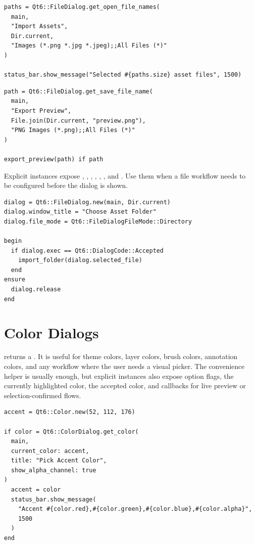 \begin{lstlisting}[style=crystal]
paths = Qt6::FileDialog.get_open_file_names(
  main,
  "Import Assets",
  Dir.current,
  "Images (*.png *.jpg *.jpeg);;All Files (*)"
)

status_bar.show_message("Selected #{paths.size} asset files", 1500)
\end{lstlisting}

\begin{lstlisting}[style=crystal]
path = Qt6::FileDialog.get_save_file_name(
  main,
  "Export Preview",
  File.join(Dir.current, "preview.png"),
  "PNG Images (*.png);;All Files (*)"
)

export_preview(path) if path
\end{lstlisting}

Explicit instances expose , , , , , , and . Use them when a file workflow needs to be configured before the dialog is shown.

\begin{lstlisting}[style=crystal]
dialog = Qt6::FileDialog.new(main, Dir.current)
dialog.window_title = "Choose Asset Folder"
dialog.file_mode = Qt6::FileDialogFileMode::Directory

begin
  if dialog.exec == Qt6::DialogCode::Accepted
    import_folder(dialog.selected_file)
  end
ensure
  dialog.release
end
\end{lstlisting}

\section{Color Dialogs}

 returns a . It is useful for theme colors, layer colors, brush colors, annotation colors, and any workflow where the user needs a visual picker. The convenience helper is usually enough, but explicit instances also expose option flags, the currently highlighted color, the accepted color, and callbacks for live preview or selection-confirmed flows.

\begin{lstlisting}[style=crystal]
accent = Qt6::Color.new(52, 112, 176)

if color = Qt6::ColorDialog.get_color(
  main,
  current_color: accent,
  title: "Pick Accent Color",
  show_alpha_channel: true
)
  accent = color
  status_bar.show_message(
    "Accent #{color.red},#{color.green},#{color.blue},#{color.alpha}",
    1500
  )
end
\end{lstlisting}

